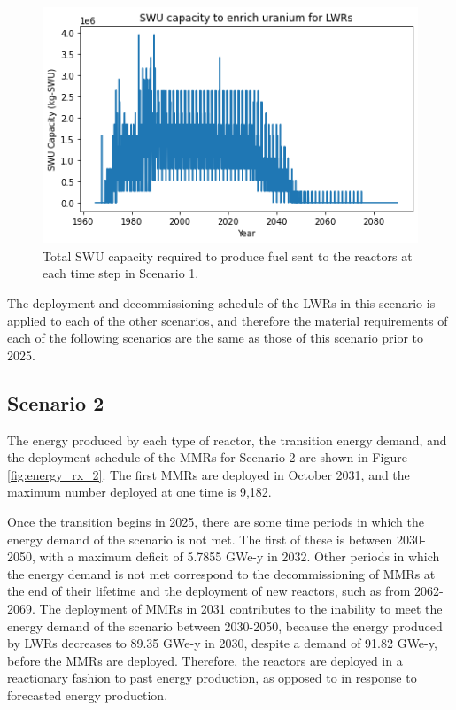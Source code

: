 \documentclass[preprint]{elsarticle}
\providecommand{\DIFaddbeginFL}{} %
\providecommand{\DIFaddendFL}{} %
\providecommand{\DIFdelbeginFL}{} %
\providecommand{\DIFdelendFL}{} %
\begin{document}
\begin{figure}
    \centering
    \DIFdelbeginFL %
\DIFdelendFL \DIFaddbeginFL \includegraphics[width=\textwidth]{../figures/totalswu_scenarios_1.png}
    \DIFaddendFL \caption{Total \gls{SWU} capacity required to produce fuel sent to the 
    reactors at each time step in Scenario 1.}
    \label{fig:swu_1}
\end{figure}

The deployment and decommissioning schedule of the \glspl{LWR} in this 
scenario is 
applied to each of the other scenarios, and therefore the material 
requirements of each of the following scenarios are the same as those 
of this scenario prior to 2025. 

\subsection{Scenario 2}
The energy produced by each type of reactor, the transition energy demand, 
and the deployment schedule of the \glspl{MMR} for Scenario 2 are shown in 
Figure \ref{fig:energy_rx_2}. The first \glspl{MMR} are deployed in 
October 2031, and the 
maximum number deployed at one time is 
9,182. 

Once the transition begins in 2025, there are some time periods in which 
the energy demand of the scenario is 
not met. The first of these is between 2030-2050, with a maximum deficit 
of 5.7855 GWe-y in 2032. Other periods in which the energy demand is not met 
correspond to the decommissioning of \glspl{MMR} at the end of their lifetime 
and the deployment of new reactors, such as from 2062-2069. 
The deployment of \glspl{MMR} in 2031 contributes to the inability to 
meet the energy demand of the scenario between 2030-2050, because the energy 
produced by 
\glspl{LWR} decreases to 89.35 GWe-y in 2030, despite a demand of 91.82
GWe-y, before the \glspl{MMR} are 
deployed. Therefore, the reactors are deployed in a reactionary fashion to 
past energy production, as opposed to in response to forecasted energy 
production.
\end{document}
